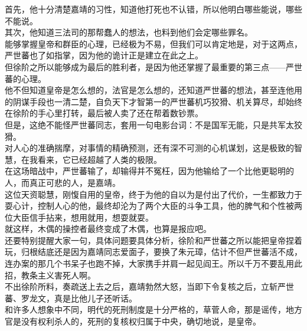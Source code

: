 \begin{multicols}{\theparacolNo}
首先，他十分清楚嘉靖的习性，知道他打死也不认错，所以他明白哪些能说，哪些不能说。\\

其次，他知道三法司的那帮蠢人的想法，也料到他们会定哪些罪名。\\

能够掌握皇帝和群臣的心理，已经极为不易，但我们可以肯定地是，对于这两点，严世蕃也了如指掌，因为他的诡计正是建立在此之上。\\

但徐阶之所以能够成为最后的胜利者，是因为他还掌握了最重要的第三点——严世蕃的心理。\\

他不但知道皇帝是怎么想的，法官是怎么想的，还知道严世蕃的想法，甚至连他用的阴谋手段也一清二楚，自负天下才智第一的严世蕃机巧狡猾、机关算尽，却始终在徐阶的手心里打转，最后被人卖了还在帮着数钞票。\\

但是，这绝不能怪严世蕃同志，套用一句电影台词：不是国军无能，只是共军太狡猾。\\

对人心的准确揣摩，对事情的精确预测，还有深不可测的心机谋划，这是极致的智慧，在我看来，它已经超越了人类的极限。\\

在这场暗战中，严世蕃输了，却输得并不冤枉，因为他输给了一个比他更聪明的人，而真正可悲的人，是嘉靖。\\

这位天资聪慧，刚愎自用的皇帝，终于为他的自以为是付出了代价，一生都致力于耍心计，控制人心的他，最终却沦为了两个大臣的斗争工具，他的脾气和个性被两位大臣信手拈来，想用就用，想耍就耍。\\

就这样，木偶的操控者最终变成了木偶，也算是报应吧。\\

还要特别提醒大家一句，具体问题要具体分析，徐阶和严世蕃之所以能把皇帝捏着玩，归根结底还是因为嘉靖同志爱面子，要换了朱元璋，估计不但严世蕃活不成，连办案的那几个书呆子也跑不掉，大家携手并肩一起见阎王。所以千万不要乱用此招，教条主义害死人啊。\\

不出徐阶所料，奏疏送上去之后，嘉靖勃然大怒，当即下令复核之后，立斩严世蕃、罗龙文，真是比他儿子还听话。\\

和许多人想象中不同，明代的死刑制度是十分严格的，草菅人命，那是谣传，地方官是没有权利杀人的，死刑的复核权归属于中央，确切地说，是皇帝。\\


\end{multicols}
